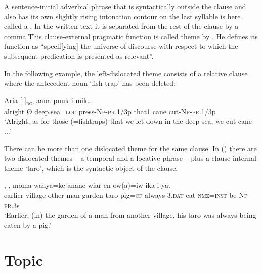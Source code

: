 A sentence-initial adverbial phrase that is syntactically outside the clause and also has its own slightly rising intonation contour on the last syllable is here called a . In the written text it is separated from the rest of the clause by a comma.This clause-external pragmatic function is called theme by \citet[19]{Dik1978}. He defines its function as ``specif[ying] the universe of discourse with respect to which the subsequent predication is presented as relevant''.

 In the following example, the left-dislocated theme consists of a relative clause where the antecedent noun  `fish trap' has been deleted:

\ea%
\label{ex:x1704}
\gll Aria  [\textstyleEmphasizedVernacularWords{{\O}}    ]\textsubscript{\textsc{rc}}, aana puuk-i-mik{\dots}\\
alright {\O} deep.sea=\textsc{loc} press-\textsc{Np}-\textsc{pr}.1/3p that1 cane cut-\textsc{Np}-\textsc{pr}.1/3p\\
\glt`Alright, as for those (=fishtraps) that we let down in the deep sea, we cut cane ...'
\z


There can be more than one dislocated theme for the same clause. In () there are two dislocated themes -- a temporal and a locative phrase -- plus a clause-internal theme  `taro', which is the syntactic object of the clause:

\ea%
\label{ex:x1700}
\gll {},      , moma  waaya=ke  anane  wiar  en-ow(a)=iw  ika-i-ya.\\
earlier  village  other  man  garden  taro pig=\textsc{cf}  always  3.\textsc{dat}  eat-\textsc{nmz}=\textsc{inst}  be-\textsc{Np}-\textsc{pr}.3s      \\
\glt`Earlier, (in) the garden of a man from another village, his taro was always being eaten by a pig.'
\z


\section{Topic} 


